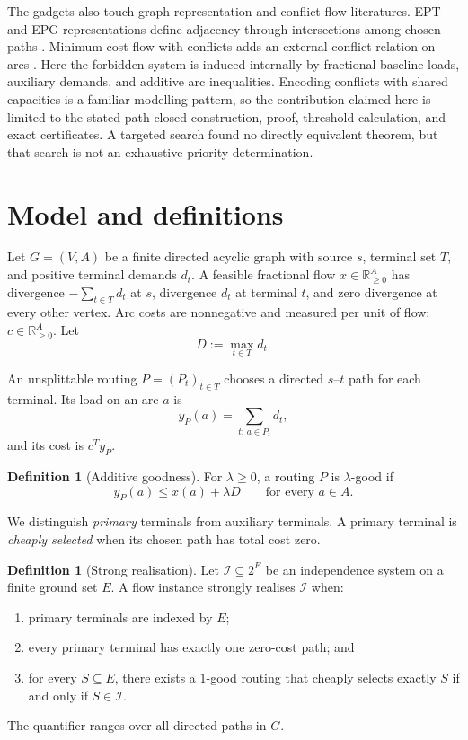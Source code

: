 \documentclass[11pt]{article}
\theoremstyle{definition}
\newtheorem{definition}[theorem]{Definition}
\newcommand{\R}{\mathbb{R}}
\newcommand{\calI}{\mathcal{I}}
\begin{document}
The gadgets also touch graph-representation and conflict-flow literatures. EPT and EPG representations define adjacency through intersections among chosen paths \cite{golumbic1985}. Minimum-cost flow with conflicts adds an external conflict relation on arcs \cite{suvak2021}. Here the forbidden system is induced internally by fractional baseline loads, auxiliary demands, and additive arc inequalities. Encoding conflicts with shared capacities is a familiar modelling pattern, so the contribution claimed here is limited to the stated path-closed construction, proof, threshold calculation, and exact certificates. A targeted search found no directly equivalent theorem, but that search is not an exhaustive priority determination.

\section{Model and definitions}\label{sec:model}

Let \(G=(V,A)\) be a finite directed acyclic graph with source \(s\), terminal set \(T\), and positive terminal demands \(d_t\). A feasible fractional flow \(x\in\R_{\ge0}^{A}\) has divergence \(-\sum_{t\in T}d_t\) at \(s\), divergence \(d_t\) at terminal \(t\), and zero divergence at every other vertex. Arc costs are nonnegative and measured per unit of flow: \(c\in\R_{\ge0}^{A}\). Let
\[
D:=\max_{t\in T}d_t.
\]

An unsplittable routing \(P=(P_t)_{t\in T}\) chooses a directed \(s\)--\(t\) path for each terminal. Its load on an arc \(a\) is
\[
y_P(a)=\sum_{t:\,a\in P_t}d_t,
\]
and its cost is \(c^Ty_P\).

\begin{definition}[Additive goodness]
For \(\lambda\ge0\), a routing \(P\) is \(\lambda\)-good if
\[
y_P(a)\le x(a)+\lambda D\qquad\text{for every }a\in A.
\]
\end{definition}

We distinguish \emph{primary} terminals from auxiliary terminals. A primary terminal is \emph{cheaply selected} when its chosen path has total cost zero.

\begin{definition}[Strong realisation]
Let \(\calI\subseteq2^E\) be an independence system on a finite ground set \(E\). A flow instance strongly realises \(\calI\) when:
\begin{enumerate}
  \item primary terminals are indexed by \(E\);
  \item every primary terminal has exactly one zero-cost path; and
  \item for every \(S\subseteq E\), there exists a \(1\)-good routing that cheaply selects exactly \(S\) if and only if \(S\in\calI\).
\end{enumerate}
The quantifier ranges over all directed paths in \(G\).
\end{definition}
\end{document}
